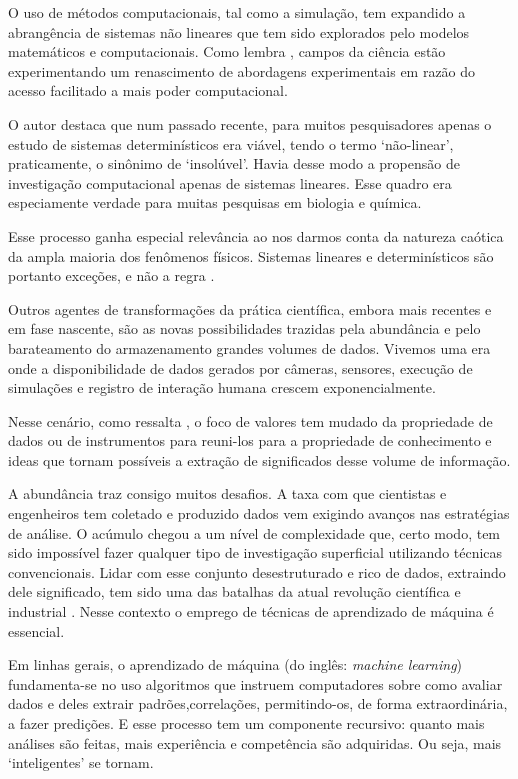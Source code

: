O uso de métodos computacionais, tal como a simulação, tem expandido a abrangência de sistemas não lineares que tem sido explorados pelo modelos matemáticos e computacionais. Como lembra , campos da ciência estão experimentando um renascimento de abordagens experimentais em razão do acesso facilitado a mais poder computacional. 

O autor destaca que num passado recente, para muitos pesquisadores apenas o estudo de sistemas determinísticos era viável, tendo o termo `não-linear', praticamente, o sinônimo de `insolúvel'. Havia desse modo a propensão de investigação computacional apenas de sistemas lineares. Esse quadro era especiamente verdade para muitas pesquisas em biologia e química. 

Esse processo ganha especial relevância ao nos darmos conta da natureza caótica da ampla maioria dos fenômenos físicos. Sistemas lineares e determinísticos são portanto exceções, e não a regra \cite[]{Weintrop2016}.

Outros agentes de transformações da prática científica, embora mais recentes e em fase nascente, são as novas possibilidades trazidas pela abundância e pelo barateamento do armazenamento grandes volumes de dados. Vivemos uma era onde a disponibilidade de dados gerados por câmeras, sensores, execução de simulações e registro de interação humana crescem exponencialmente. 

Nesse cenário, como ressalta , o foco de valores tem mudado da propriedade de dados ou de instrumentos para reuni-los para a propriedade de conhecimento e ideas que tornam possíveis a extração de significados desse volume de informação. 

A abundância traz consigo muitos desafios. A taxa com que cientistas e engenheiros tem coletado e produzido dados vem exigindo avanços nas estratégias de análise. O acúmulo chegou a um nível de complexidade que, certo modo, tem sido impossível fazer qualquer tipo de investigação superficial utilizando técnicas convencionais. Lidar com esse conjunto desestruturado e rico de dados, extraindo dele significado, tem sido uma das batalhas da atual revolução científica e industrial \cite[]{Djorgovski2005}. Nesse contexto o emprego de técnicas de aprendizado de máquina é essencial.

Em linhas gerais, o aprendizado de máquina (do inglês: \textit{machine learning}) fundamenta-se no uso algoritmos que instruem computadores sobre como avaliar dados e deles extrair padrões,correlações, permitindo-os, de forma extraordinária, a fazer predições. E esse processo tem um componente recursivo: quanto mais análises são feitas, mais experiência e competência são adquiridas. Ou seja, mais `inteligentes' se tornam.

